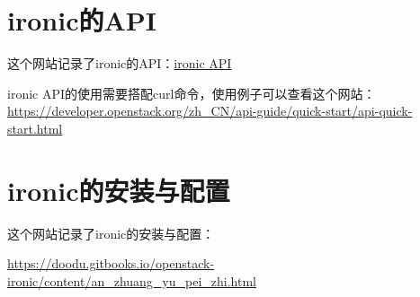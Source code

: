 \documentclass[a4paper,left=1.5cm,right=1.5cm,11pt]{article}
\begin{document}
\section{ironic的API}
	这个网站记录了ironic的API：\href{https://developer.openstack.org/api-ref/baremetal/?expanded=list-api-versions-detail,show-v1-api-detail,create-node-detail,list-nodes-detail,list-nodes-detailed-detail,show-node-details-detail,update-node-detail,delete-node-detail,validate-node-detail,set-maintenance-flag-detail,clear-maintenance-flag-detail,set-boot-device-detail,get-boot-device-detail,get-supported-boot-devices-detail,inject-nmi-non-masking-interrupts-detail,node-state-summary-detail,change-node-power-state-detail,change-node-provision-state-detail,set-raid-config-detail,get-console-detail,start-stop-console-detail,list-methods-detail,call-a-method-detail,list-attached-vifs-of-a-node-detail,attach-a-vif-to-a-node-detail,detach-vif-from-a-node-detail,list-portgroups-detail,create-portgroup-detail,list-detailed-portgroups-detail,show-portgroup-details-detail,update-a-portgroup-detail,delete-portgroup-detail,list-portgroups-by-node-detail,list-detailed-portgroups-by-node-detail,list-ports-detail,create-port-detail,list-detailed-ports-detail,show-port-details-detail,update-a-port-detail,delete-port-detail,list-ports-by-node-detail,list-detailed-ports-by-node-detail,list-ports-by-portgroup-detail,list-detailed-ports-by-portgroup-detail,list-drivers-detail,show-driver-details-detail,show-driver-properties-detail,show-driver-logical-disk-properties-detail,id104-detail,id108-detail,list-chassis-with-details-detail,show-chassis-details-detail,update-chassis-detail,delete-chassis-detail,create-chassis-detail,list-chassis-detail,agent-lookup-detail,agent-heartbeat-detail}{ironic API}\par

	ironic API的使用需要搭配curl命令，使用例子可以查看这个网站：
	\url{https://developer.openstack.org/zh_CN/api-guide/quick-start/api-quick-start.html}

\section{ironic的安装与配置}
	这个网站记录了ironic的安装与配置：\par
	\url{https://doodu.gitbooks.io/openstack-ironic/content/an_zhuang_yu_pei_zhi.html}
\end{document}
